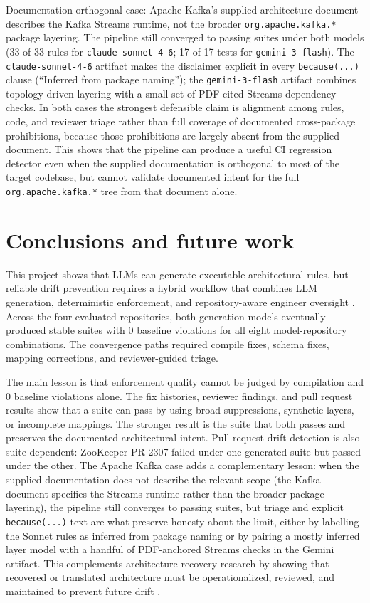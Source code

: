 \documentclass[sigconf,screen]{acmart}
\begin{document}
Documentation-orthogonal case: Apache Kafka's supplied architecture document describes the Kafka Streams runtime, not the broader \texttt{org.apache.kafka.*} package layering. The pipeline still converged to passing suites under both models (33 of 33 rules for \texttt{claude-sonnet-4-6}; 17 of 17 tests for \texttt{gemini-3-flash}). The \texttt{claude-sonnet-4-6} artifact makes the disclaimer explicit in every \texttt{because(...)} clause (``Inferred from package naming''); the \texttt{gemini-3-flash} artifact combines topology-driven layering with a small set of PDF-cited Streams dependency checks. In both cases the strongest defensible claim is alignment among rules, code, and reviewer triage rather than full coverage of documented cross-package prohibitions, because those prohibitions are largely absent from the supplied document. This shows that the pipeline can produce a useful CI regression detector even when the supplied documentation is orthogonal to most of the target codebase, but cannot validate documented intent for the full \texttt{org.apache.kafka.*} tree from that document alone.

\section{Conclusions and future work}
This project shows that LLMs can generate executable architectural rules, but reliable drift prevention requires a hybrid workflow that combines LLM generation, deterministic enforcement, and repository-aware engineer oversight \cite{schindler2024,su2026evaluating}. Across the four evaluated repositories, both generation models eventually produced stable suites with 0 baseline violations for all eight model-repository combinations. The convergence paths required compile fixes, schema fixes, mapping corrections, and reviewer-guided triage.

The main lesson is that enforcement quality cannot be judged by compilation and 0 baseline violations alone. The fix histories, reviewer findings, and pull request results show that a suite can pass by using broad suppressions, synthetic layers, or incomplete mappings. The stronger result is the suite that both passes and preserves the documented architectural intent. Pull request drift detection is also suite-dependent: ZooKeeper PR-2307 failed under one generated suite but passed under the other. The Apache Kafka case adds a complementary lesson: when the supplied documentation does not describe the relevant scope (the Kafka document specifies the Streams runtime rather than the broader package layering), the pipeline still converges to passing suites, but triage and explicit \texttt{because(...)} text are what preserve honesty about the limit, either by labelling the Sonnet rules as inferred from package naming or by pairing a mostly inferred layer model with a handful of PDF-anchored Streams checks in the Gemini artifact. This complements architecture recovery research by showing that recovered or translated architecture must be operationalized, reviewed, and maintained to prevent future drift \cite{pan2026}.
\end{document}
